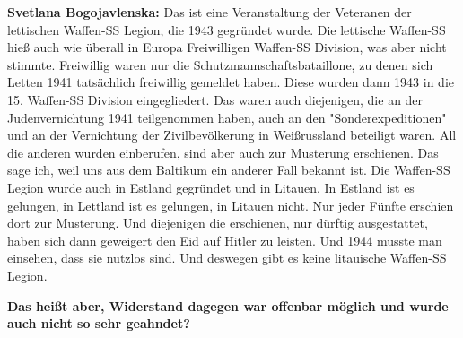 \textbf{Svetlana Bogojavlenska:} Das ist eine Veranstaltung der Veteranen der lettischen Waffen-SS Legion, die 1943 gegründet wurde. Die lettische Waffen-SS hieß auch wie überall in Europa Freiwilligen Waffen-SS Division, was aber nicht stimmte. Freiwillig waren nur die Schutzmannschaftsbataillone, zu denen sich Letten 1941 tatsächlich freiwillig gemeldet haben. Diese wurden dann 1943 in die 15. Waffen-SS Division eingegliedert. Das waren auch diejenigen, die an der Judenvernichtung 1941 teilgenommen haben, auch an den "Sonderexpeditionen" und an der Vernichtung der Zivilbevölkerung in Weißrussland beteiligt waren. All die anderen wurden einberufen, sind aber auch zur Musterung erschienen. Das sage ich, weil uns aus dem Baltikum ein anderer Fall bekannt ist. Die Waffen-SS Legion wurde auch in Estland gegründet und in Litauen. In Estland ist es gelungen, in Lettland ist es gelungen, in Litauen nicht. Nur jeder Fünfte erschien dort zur Musterung. Und diejenigen die erschienen, nur dürftig ausgestattet, haben sich dann geweigert den Eid auf Hitler zu leisten. Und 1944 musste man einsehen, dass sie nutzlos sind. Und deswegen gibt es keine litauische Waffen-SS Legion. 

\textbf{Das heißt aber, Widerstand dagegen war offenbar möglich und wurde auch nicht so sehr geahndet?}

